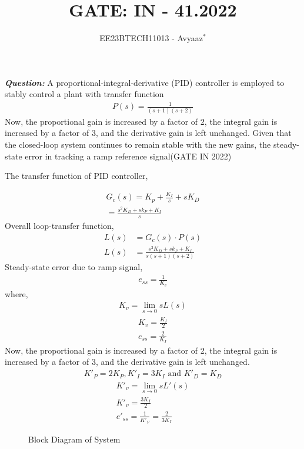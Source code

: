 \documentclass[journal,12pt,twocolumn]{IEEEtran}
\theoremstyle{remark}
\begin{document}

\vspace{3cm}

\title{GATE: IN - 41.2022}
\author{EE23BTECH11013 - Avyaaz$^{*}$%
}
\maketitle
\newpage
\bigskip

\renewcommand{\thefigure}{\arabic{figure}}
\renewcommand{\thetable}{\arabic{table}}

\large\textbf{\textsl{Question:}}
A proportional-integral-derivative (PID) controller is employed to stably control a
plant with transfer function
\begin{align}
    P(s) = \frac{1}{(s+1)(s+2)}
\end{align}
Now, the proportional gain is increased by a factor of $2$, the integral gain is
increased by a factor of $3$, and the derivative gain is left unchanged. Given that the closed-loop system continues to remain stable with the new gains, the steady-state
error in tracking a ramp reference signal\hfill(GATE IN 2022) \\
\solution

\noindent The transfer function of PID controller,

\begin{align}
    G_c(s) = K_p + \frac{K_I}{s} +sK_D\\
    =\frac{s^2K_D + sk_P + K_I}{s}
\end{align}
Overall loop-transfer function,
\begin{align}
    L(s) &= G_c(s)\cdot P(s)\\
    L(s) &= \frac{s^2K_D + sk_P + K_I}{s(s+1)(s+2)}
\end{align}
Steady-state error due to ramp signal,
\begin{align}
    e_{ss} = \frac{1}{K_v}
\end{align}
where,
\begin{align}
    K_v = \lim_{s \to 0} sL(s)
\end{align}
\begin{align}
    K_v = \frac{K_I}{2}\\
    e_{ss} = \frac{2}{K_I}
\end{align}
Now, the proportional gain is increased by a factor of 2, the integral gain is increased by a factor of 3, and the derivative gain is left unchanged.
\begin{align}
    K'_P = 2K_P, K'_I = 3K_I \text{ and } K'_D = K_D
\end{align}
\begin{align}
    K'_v = \lim_{s \to 0} sL'(s)\\
    K'_v = \frac{3K_I}{2}\\
    e'_{ss} = \frac{1}{K'_V} = \frac{2}{3K_I}
\end{align}
\begin{figure}[!ht]
    \resizebox{0.55\textwidth}{!}{}
    \caption{Block Diagram of System}
    \label{fig:gate_IN_Q41_blockdiagram}
\end{figure}


% 
\end{document}
